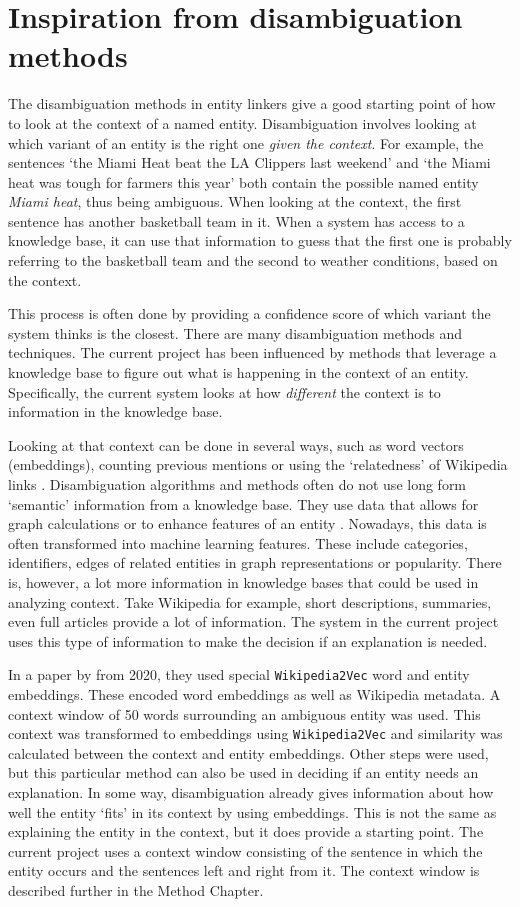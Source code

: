 \documentclass[
10pt, %
a4paper, %
oneside, %
headinclude,footinclude, %
] {book}%
\begin{document}
\section{Inspiration from disambiguation methods}
The disambiguation methods in entity linkers give a good starting point of how to look at the context of a named entity.
Disambiguation involves looking at which variant of an entity is the right one \textit{given the context}.
For example, the sentences `the Miami Heat beat the LA Clippers last weekend' and `the Miami heat was tough for farmers this year' both contain the possible named entity \textit{Miami heat}, thus being ambiguous.
When looking at the context, the first sentence has another basketball team in it.
When a system has access to a knowledge base, it can use that information to guess that the first one is probably referring to the basketball team and the second to weather conditions, based on the context.

This process is often done by providing a confidence score of which variant the system thinks is the closest.
There are many disambiguation methods and techniques.
The current project has been influenced by methods that leverage a knowledge base to figure out what is happening in the context of an entity.
Specifically, the current system looks at how \textit{different} the context is to information in the knowledge base.

Looking at that context can be done in several ways, such as word vectors (embeddings), counting previous mentions or using the `relatedness' of Wikipedia links \citep{delpeuch2019,ma2019,vanhulst2020}.
Disambiguation algorithms and methods often do not use long form `semantic' information from a knowledge base.
They use data that allows for graph calculations or to enhance features of an entity \citep{rao2013}.
Nowadays, this data is often transformed into machine learning features.
These include categories, identifiers, edges of related entities in graph representations or popularity.
There is, however, a lot more information in knowledge bases that could be used in analyzing context.
Take Wikipedia for example, short descriptions, summaries, even full articles provide a lot of information.
The system in the current project uses this type of information to make the decision if an explanation is needed.

In a paper by \citeauthor{vanhulst2020} from 2020, they used special \verb+Wikipedia2Vec+ word and entity embeddings.
These encoded word embeddings as well as Wikipedia metadata.
A context window of 50 words surrounding an ambiguous entity was used.
This context was transformed to embeddings using \verb+Wikipedia2Vec+ and similarity was calculated between the context and entity embeddings.
Other steps were used, but this particular method can also be used in deciding if an entity needs an explanation.
In some way, disambiguation already gives information about how well the entity `fits' in its context by using embeddings.
This is not the same as explaining the entity in the context, but it does provide a starting point.
The current project uses a context window consisting of the sentence in which the entity occurs and the sentences left and right from it.
The context window is described further in the Method Chapter.
\end{document}
